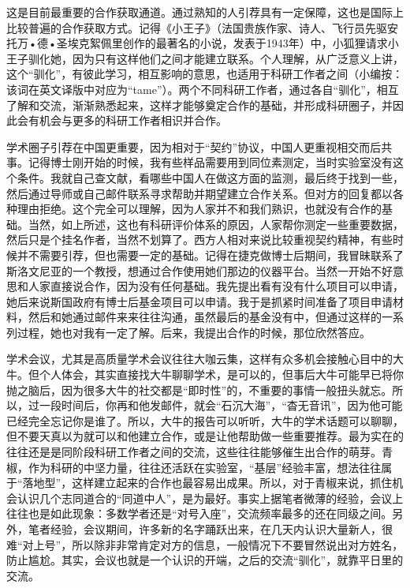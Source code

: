 \documentclass[]{book}
\begin{document}
这是目前最重要的合作获取通道。通过熟知的人引荐具有一定保障，这也是国际上比较普遍的合作获取方式。记得《小王子》（法国贵族作家、诗人、飞行员先驱安托万•德•圣埃克絮佩里创作的最著名的小说，发表于1943年）中，小狐狸请求小王子驯化她，因为只有这样他们之间才能建立联系。个人理解，从广泛意义上讲，这个``驯化''，有彼此学习，相互影响的意思，也适用于科研工作者之间（小编按：该词在英文译版中对应为``tame''）。两个不同科研工作者，通过各自``驯化''，相互了解和交流，渐渐熟悉起来，这样才能够奠定合作的基础，并形成科研圈子，并因此会有机会与更多的科研工作者相识并合作。

学术圈子引荐在中国更重要，因为相对于``契约''协议，中国人更重视相交而后共事。记得博士刚开始的时候，我有些样品需要用到同位素测定，当时实验室没有这个条件。我就自己查文献，看哪些中国人在做这方面的监测，最后终于找到一些，然后通过导师或自己邮件联系寻求帮助并期望建立合作关系。但对方的回复都以各种理由拒绝。这个完全可以理解，因为人家并不和我们熟识，也就没有合作的基础。当然，如上所述，这也有科研评价体系的原因，人家帮你测定一些重要数据，然后只是个挂名作者，当然不划算了。西方人相对来说比较重视契约精神，有些时候并不需要引荐，但也需要一定的基础。记得在捷克做博士后期间，我冒昧联系了斯洛文尼亚的一个教授，想通过合作使用她们那边的仪器平台。当然一开始不好意思和人家直接说合作，因为没有任何基础。我先提出看有没有什么项目可以申请，她后来说斯国政府有博士后基金项目可以申请。我于是抓紧时间准备了项目申请材料，然后和她通过邮件来来往往沟通，虽然最后的基金没有中，但通过这样的一系列过程，她也对我有一定了解。后来，我提出合作的时候，那位欣然答应。

学术会议，尤其是高质量学术会议往往大咖云集，这样有众多机会接触心目中的大牛。但个人体会，其实直接找大牛聊聊学术，是可以的，但事后大牛可能早已将你抛之脑后，因为很多大牛的社交都是``即时性''的，不重要的事情一般扭头就忘。所以，过一段时间后，你再和他发邮件，就会``石沉大海''，``杳无音讯''，因为他可能已经完全忘记你是谁了。所以，大牛的报告可以听听，大牛的学术话题可以聊聊，但不要天真以为就可以和他建立合作，或是让他帮助做一些重要推荐。最为实在的往往还是是同阶段科研工作者之间的交流，这些往往能够催生出合作的萌芽。青椒，作为科研的中坚力量，往往还活跃在实验室，``基层''经验丰富，想法往往属于``落地型''，这样建立起来的合作也最容易出成果。所以，对于青椒来说，抓住机会认识几个志同道合的``同道中人''，是为最好。事实上据笔者微薄的经验，会议上往往也是如此现象：多数学者还是``对号入座''，交流频率最多的还在同级之间。另外，笔者经验，会议期间，许多新的名字踊跃出来，在几天内认识大量新人，很难``对上号''，所以除非非常肯定对方的信息，一般情况下不要冒然说出对方姓名，防止尴尬。其实，会议也就是一个认识的开端，之后的交流``驯化''，就靠平日里的交流。
\end{document}
